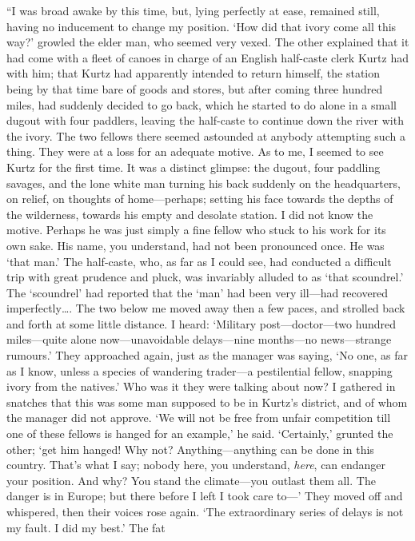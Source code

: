 \documentclass[12pt]{report}
\begin{document}
``I was broad awake by this time, but, lying perfectly at ease, remained
still, having no inducement to change my position. `How did that ivory
come all this way?' growled the elder man, who seemed very vexed. The
other explained that it had come with a fleet of canoes in charge of an
English half-caste clerk Kurtz had with him; that Kurtz had apparently
intended to return himself, the station being by that time bare of goods
and stores, but after coming three hundred miles, had suddenly decided
to go back, which he started to do alone in a small dugout with four
paddlers, leaving the half-caste to continue down the river with the
ivory. The two fellows there seemed astounded at anybody attempting such
a thing. They were at a loss for an adequate motive. As to me, I seemed
to see Kurtz for the first time. It was a distinct glimpse: the dugout,
four paddling savages, and the lone white man turning his back suddenly
on the headquarters, on relief, on thoughts of home---perhaps; setting
his face towards the depths of the wilderness, towards his empty and
desolate station. I did not know the motive. Perhaps he was just simply
a fine fellow who stuck to his work for its own sake. His name, you
understand, had not been pronounced once. He was `that man.' The
half-caste, who, as far as I could see, had conducted a difficult trip
with great prudence and pluck, was invariably alluded to as `that
scoundrel.' The `scoundrel' had reported that the `man' had been very
ill---had recovered imperfectly\ldots{}. The two below me moved away
then a few paces, and strolled back and forth at some little distance. I
heard: `Military post---doctor---two hundred miles---quite alone
now---unavoidable delays---nine months---no news---strange rumours.'
They approached again, just as the manager was saying, `No one, as far
as I know, unless a species of wandering trader---a pestilential fellow,
snapping ivory from the natives.' Who was it they were talking about
now? I gathered in snatches that this was some man supposed to be in
Kurtz's district, and of whom the manager did not approve. `We will not
be free from unfair competition till one of these fellows is hanged for
an example,' he said. `Certainly,' grunted the other; `get him hanged!
Why not? Anything---anything can be done in this country. That's what I
say; nobody here, you understand, \emph{here}, can endanger your
position. And why? You stand the climate---you outlast them all. The
danger is in Europe; but there before I left I took care to---' They
moved off and whispered, then their voices rose again. `The
extraordinary series of delays is not my fault. I did my best.' The fat
\end{document}
